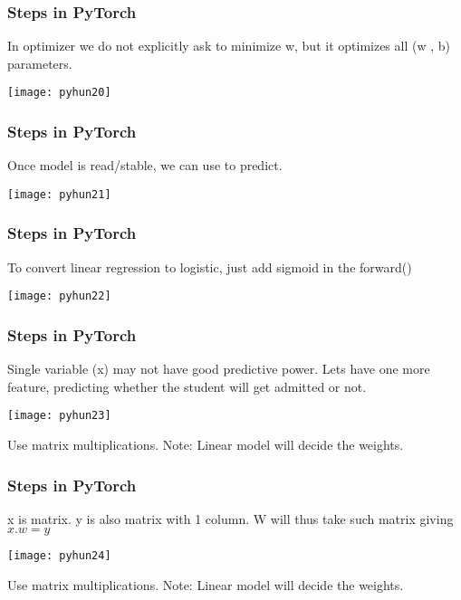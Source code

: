 \begin{frame}[fragile] \frametitle{Steps in PyTorch}
In optimizer we do not explicitly ask to minimize w, but it optimizes all (w , b) parameters.

\begin{center}
\texttt{[image: pyhun20]}
\end{center}


\end{frame}

\begin{frame}[fragile] \frametitle{Steps in PyTorch}
Once model is read/stable, we can use to predict.

\begin{center}
\texttt{[image: pyhun21]}
\end{center}


\end{frame}


\begin{frame}[fragile] \frametitle{Steps in PyTorch}
To convert linear regression to logistic, just add sigmoid in the forward()

\begin{center}
\texttt{[image: pyhun22]}
\end{center}



\end{frame}


\begin{frame}[fragile] \frametitle{Steps in PyTorch}
Single variable (x) may not have good predictive power. Lets have one more feature, predicting whether the student will get admitted or not.

\begin{center}
\texttt{[image: pyhun23]}
\end{center}

Use matrix multiplications. Note: Linear model will decide the weights.


\end{frame}

\begin{frame}[fragile] \frametitle{Steps in PyTorch}
x is matrix. y is also matrix with 1 column. W will thus take such matrix giving $x.w = y$

\begin{center}
\texttt{[image: pyhun24]}
\end{center}

Use matrix multiplications. Note: Linear model will decide the weights.


\end{frame}


